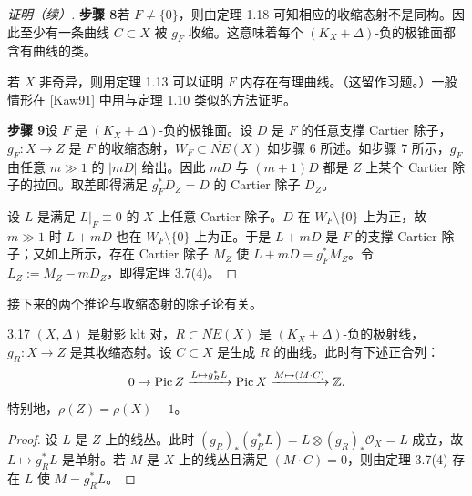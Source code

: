\begin{proof}[证明（续）]
\par\medskip\noindent\textbf{步骤 8}\quad 若 $F\neq\{0\}$，则由定理 1.18 可知相应的收缩态射不是同构。因此至少有一条曲线 $C\subset X$ 被 $g_F$ 收缩。这意味着每个 $(K_X+\Delta)$-负的极锥面都含有曲线的类。

若 $X$ 非奇异，则用定理 1.13 可以证明 $F$ 内存在有理曲线。（这留作习题。）一般情形在 [Kaw91] 中用与定理 1.10 类似的方法证明。

\par\medskip\noindent\textbf{步骤 9}\quad 设 $F$ 是 $(K_X+\Delta)$-负的极锥面。设 $D$ 是 $F$ 的任意支撑 Cartier 除子，$g_F:X\to Z$ 是 $F$ 的收缩态射，$W_F\subset\overline{NE}(X)$ 如步骤 6 所述。如步骤 7 所示，$g_F$ 由任意 $m\gg 1$ 的 $|mD|$ 给出。因此 $mD$ 与 $(m+1)D$ 都是 $Z$ 上某个 Cartier 除子的拉回。取差即得满足 $g_F^*D_Z=D$ 的 Cartier 除子 $D_Z$。

设 $L$ 是满足 $L|_F\equiv 0$ 的 $X$ 上任意 Cartier 除子。$D$ 在 $W_F\setminus\{0\}$ 上为正，故 $m\gg 1$ 时 $L+mD$ 也在 $W_F\setminus\{0\}$ 上为正。于是 $L+mD$ 是 $F$ 的支撑 Cartier 除子；又如上所示，存在 Cartier 除子 $M_Z$ 使 $L+mD=g_F^*M_Z$。令 $L_Z:=M_Z-mD_Z$，即得定理 3.7(4)。
\end{proof}

接下来的两个推论与收缩态射的除子论有关。

\begin{corollaryp}{3.17}
$(X,\Delta)$ 是射影 klt 对，$R\subset\overline{NE}(X)$ 是 $(K_X+\Delta)$-负的极射线，$g_R:X\to Z$ 是其收缩态射。设 $C\subset X$ 是生成 $R$ 的曲线。此时有下述正合列：
\[
0\to\operatorname{Pic} Z\xrightarrow{L\mapsto g_R^*L}\operatorname{Pic} X\xrightarrow{M\mapsto(M\cdot C)}\mathbb{Z}.
\]
特别地，$\rho(Z)=\rho(X)-1$。
\end{corollaryp}

\begin{proof}
设 $L$ 是 $Z$ 上的线丛。此时 $(g_R)_*(g_R^*L)=L\otimes(g_R)_*\mathcal{O}_X=L$ 成立，故 $L\mapsto g_R^*L$ 是单射。若 $M$ 是 $X$ 上的线丛且满足 $(M\cdot C)=0$，则由定理 3.7(4) 存在 $L$ 使 $M=g_R^*L$。
\end{proof}

